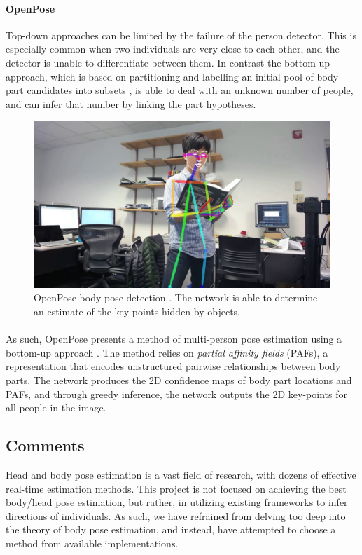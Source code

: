 \paragraph{OpenPose} Top-down approaches can be limited by the failure of the person detector. This is especially common when two individuals are very close to each other, and the detector is unable to differentiate between them. In contrast the bottom-up approach, which is based on partitioning and labelling an initial pool of body part candidates into subsets \cite{Pishchulin}, is able to deal with an unknown number of people, and can infer that number by linking the part hypotheses.

\begin{figure}[ht]
	\centering
	\includegraphics[width=.7\linewidth]{img/chapter2_background/openpose.jpg}
	\caption{OpenPose body pose detection \cite{Cao2017}. The network is able to determine an estimate of the key-points hidden by objects.}
	\vspace{-1\baselineskip}
\end{figure}

\paragraph{} As such, OpenPose presents a method of multi-person pose estimation using a bottom-up approach \cite{Cao2017}. The method relies on \textit{partial affinity fields} (PAFs), a representation that encodes unstructured pairwise relationships between body parts. The network produces the 2D confidence maps of body part locations and PAFs, and through greedy inference, the network outputs the 2D key-points for all people in the image.

\subsection{Comments}
Head and body pose estimation is a vast field of research, with dozens of effective real-time estimation methods. This project is not focused on achieving the best body/head pose estimation, but rather, in utilizing existing frameworks to infer directions of individuals. As such, we have refrained from delving too deep into the theory of body pose estimation, and instead, have attempted to choose a method from available implementations.

